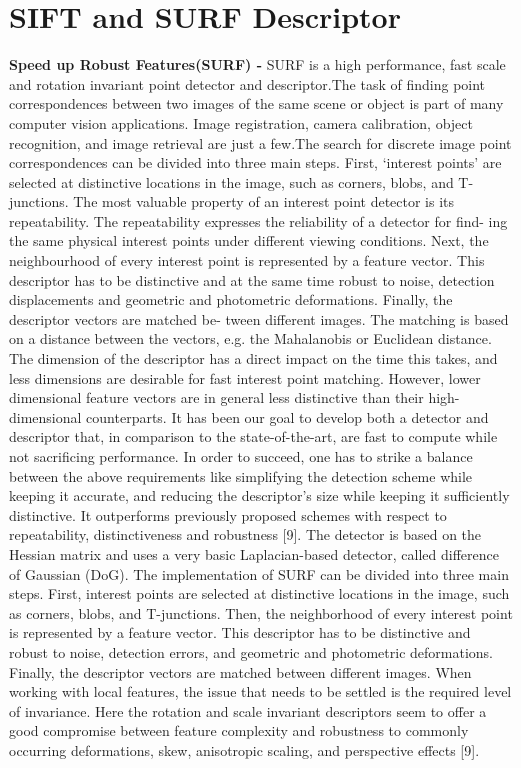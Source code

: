 \section{SIFT and SURF Descriptor}
\label{sec:build2}

\textbf{Speed up Robust Features(SURF) - } SURF is a high performance, fast scale and rotation invariant point detector and descriptor.The task of finding point correspondences between two images of the same scene or object is part of many computer vision applications. Image registration, camera calibration, object recognition, and image retrieval are just a few.The search for discrete image point correspondences can be divided into three main steps. First, ‘interest points’ are selected at distinctive locations in the image, such as corners, blobs, and T-junctions. The most valuable property of an interest point detector is its repeatability. The repeatability expresses the reliability of a detector for find- ing the same physical interest points under different viewing conditions. Next, the neighbourhood of every interest point is represented by a feature vector. This descriptor has to be distinctive and at the same time robust to noise, detection displacements and geometric and photometric deformations. Finally, the descriptor vectors are matched be- tween different images. The matching is based on a distance between the vectors, e.g. the Mahalanobis or Euclidean distance. The dimension of the descriptor has a direct impact on the time this takes, and less dimensions are desirable for fast interest point matching. However, lower dimensional feature vectors are in general less distinctive than their high-dimensional counterparts.
It has been our goal to develop both a detector and descriptor that, in comparison to the state-of-the-art, are fast to compute while not sacrificing performance. In order to succeed, one has to strike a balance between the above requirements like simplifying the detection scheme while keeping it accurate, and reducing the descriptor’s size while keeping it sufficiently distinctive.
 It outperforms previously proposed schemes with respect to repeatability, distinctiveness and robustness [9]. The detector is based on the Hessian matrix and uses a very basic Laplacian-based detector, called difference of Gaussian (DoG). The implementation of SURF can be divided into three main steps. First, interest points are selected at distinctive locations in the image, such as corners, blobs, and T-junctions. Then, the neighborhood of every interest point is represented by a feature vector. This descriptor has to be distinctive and robust to noise, detection errors, and geometric and photometric deformations. Finally, the descriptor vectors are matched between different images. When working with local features, the issue that needs to be settled is the required level of invariance. Here the rotation and scale invariant descriptors seem to offer a good compromise between feature complexity and robustness to commonly occurring deformations, skew, anisotropic scaling, and perspective effects [9].


